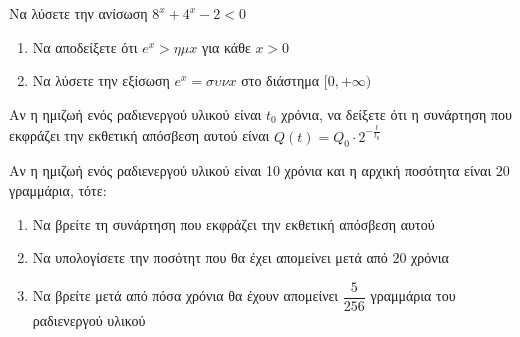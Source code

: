 \documentclass[greek]{beamer}
\begin{document}
\begin{askisi}
  Να λύσετε την ανίσωση $8^x+4^x-2<0$


\end{askisi}

\begin{askisi}
  \begin{enumerate}
    \item<1-> Να αποδείξετε ότι $e^x>ημx$ για κάθε $x>0$
    \item<2-> Να λύσετε την εξίσωση $e^x=συνx$ στο διάστημα $[0,+\infty)$
  \end{enumerate}


\end{askisi}

\begin{askisi}
  Αν η ημιζωή ενός ραδιενεργού υλικού είναι $t_0$ χρόνια, να δείξετε ότι η συνάρτηση που εκφράζει την εκθετική απόσβεση αυτού είναι $Q(t)=Q_0\cdot 2^{-\frac{t}{t_0}}$


\end{askisi}

\begin{askisi}
  Αν η ημιζωή ενός ραδιενεργού υλικού είναι 10 χρόνια και η αρχική ποσότητα είναι $20$ γραμμάρια, τότε:
  \begin{enumerate}
    \item<1-> Να βρείτε τη συνάρτηση που εκφράζει την εκθετική απόσβεση αυτού
    \item<2-> Να υπολογίσετε την ποσότητ που θα έχει απομείνει μετά από $20$ χρόνια
    \item<3-> Να βρείτε μετά από πόσα χρόνια θα έχουν απομείνει $\dfrac{5}{256}$ γραμμάρια του ραδιενεργού υλικού
  \end{enumerate}


\end{askisi}


%
%
%
%
%
%
%
\end{document}
